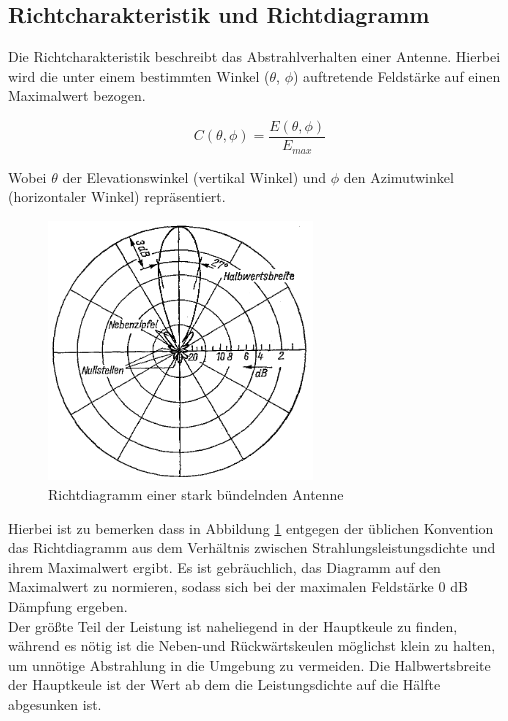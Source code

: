 \subsection{Richtcharakteristik und Richtdiagramm}
Die Richtcharakteristik beschreibt das Abstrahlverhalten einer Antenne. Hierbei wird die unter einem bestimmten Winkel ($\theta$, $\phi$) auftretende Feldstärke auf einen Maximalwert bezogen\cite[p. 20]{Kraus-2002-AntennasB}.

\begin{equation}
	C(\theta, \phi)=\frac{E(\theta, \phi)}{E_{max}}
\end{equation}

Wobei $\theta$ der Elevationswinkel (vertikal Winkel) und $\phi$ den Azimutwinkel (horizontaler Winkel) repräsentiert.

\begin{figure}[H]
	\centering
	\includegraphics[width=7cm]{../ref/Richtdiagramm_Beispiel}
	\caption{Richtdiagramm einer stark bündelnden Antenne \cite{richtdiagramm_beispiel}}
	\label{fig:Richtdiagramm Beispiel}
\end{figure}

Hierbei ist zu bemerken dass in Abbildung \ref{fig:Richtdiagramm Beispiel} entgegen der üblichen Konvention das Richtdiagramm aus dem Verhältnis zwischen Strahlungsleistungsdichte und ihrem Maximalwert ergibt. Es ist gebräuchlich, das Diagramm auf den Maximalwert zu normieren, sodass sich bei der maximalen Feldstärke 0 dB Dämpfung ergeben.\\

Der größte Teil der Leistung ist naheliegend in der Hauptkeule zu finden, während es nötig ist die Neben-und Rückwärtskeulen möglichst klein zu halten, um unnötige Abstrahlung in die Umgebung zu vermeiden. Die Halbwertsbreite der Hauptkeule ist der Wert ab dem die Leistungsdichte auf die Hälfte abgesunken ist.\\

